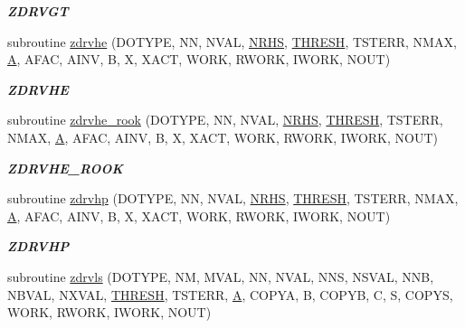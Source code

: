 \begin{DoxyCompactItemize}
\begin{DoxyCompactList}\small\item\em {\bfseries Z\+D\+R\+V\+G\+T} \end{DoxyCompactList}\item 
subroutine \hyperlink{group__complex16__lin_ga78ef42857c9b27155c0a9a9429e42d4d}{zdrvhe} (D\+O\+T\+Y\+P\+E, N\+N, N\+V\+A\+L, \hyperlink{example__user_8c_aa0138da002ce2a90360df2f521eb3198}{N\+R\+H\+S}, \hyperlink{zlaqgs_8c_a0656018abfc9fa2821827415f5d5ea57}{T\+H\+R\+E\+S\+H}, T\+S\+T\+E\+R\+R, N\+M\+A\+X, \hyperlink{classA}{A}, A\+F\+A\+C, A\+I\+N\+V, B, X, X\+A\+C\+T, W\+O\+R\+K, R\+W\+O\+R\+K, I\+W\+O\+R\+K, N\+O\+U\+T)
\begin{DoxyCompactList}\small\item\em {\bfseries Z\+D\+R\+V\+H\+E} \end{DoxyCompactList}\item 
subroutine \hyperlink{group__complex16__lin_ga8c13359f6de6e6c5fdc0e764b9e6f208}{zdrvhe\+\_\+rook} (D\+O\+T\+Y\+P\+E, N\+N, N\+V\+A\+L, \hyperlink{example__user_8c_aa0138da002ce2a90360df2f521eb3198}{N\+R\+H\+S}, \hyperlink{zlaqgs_8c_a0656018abfc9fa2821827415f5d5ea57}{T\+H\+R\+E\+S\+H}, T\+S\+T\+E\+R\+R, N\+M\+A\+X, \hyperlink{classA}{A}, A\+F\+A\+C, A\+I\+N\+V, B, X, X\+A\+C\+T, W\+O\+R\+K, R\+W\+O\+R\+K, I\+W\+O\+R\+K, N\+O\+U\+T)
\begin{DoxyCompactList}\small\item\em {\bfseries Z\+D\+R\+V\+H\+E\+\_\+\+R\+O\+O\+K} \end{DoxyCompactList}\item 
subroutine \hyperlink{group__complex16__lin_ga2bc016c25ffedc0b04b5c91981679a3a}{zdrvhp} (D\+O\+T\+Y\+P\+E, N\+N, N\+V\+A\+L, \hyperlink{example__user_8c_aa0138da002ce2a90360df2f521eb3198}{N\+R\+H\+S}, \hyperlink{zlaqgs_8c_a0656018abfc9fa2821827415f5d5ea57}{T\+H\+R\+E\+S\+H}, T\+S\+T\+E\+R\+R, N\+M\+A\+X, \hyperlink{classA}{A}, A\+F\+A\+C, A\+I\+N\+V, B, X, X\+A\+C\+T, W\+O\+R\+K, R\+W\+O\+R\+K, I\+W\+O\+R\+K, N\+O\+U\+T)
\begin{DoxyCompactList}\small\item\em {\bfseries Z\+D\+R\+V\+H\+P} \end{DoxyCompactList}\item 
subroutine \hyperlink{group__complex16__lin_gad4022226c625e048ff4960d96295a92d}{zdrvls} (D\+O\+T\+Y\+P\+E, N\+M, M\+V\+A\+L, N\+N, N\+V\+A\+L, N\+N\+S, N\+S\+V\+A\+L, N\+N\+B, N\+B\+V\+A\+L, N\+X\+V\+A\+L, \hyperlink{zlaqgs_8c_a0656018abfc9fa2821827415f5d5ea57}{T\+H\+R\+E\+S\+H}, T\+S\+T\+E\+R\+R, \hyperlink{classA}{A}, C\+O\+P\+Y\+A, B, C\+O\+P\+Y\+B, C, S, C\+O\+P\+Y\+S, W\+O\+R\+K, R\+W\+O\+R\+K, I\+W\+O\+R\+K, N\+O\+U\+T)

\end{DoxyCompactItemize}
